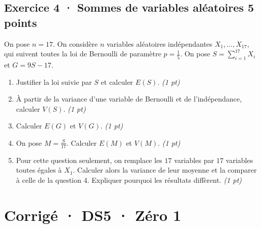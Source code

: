 \subsection*{Exercice 4 · Sommes de variables aléatoires \hfill 5 points}On pose $n=17$. On considère $n$ variables aléatoires indépendantes $X_1,\ldots,X_{17}$, qui suivent toutes la loi de Bernoulli de paramètre $p=\frac{1}{5}$. On pose $S=\displaystyle\sum_{i=1}^{17}X_i$ et $G=9S-17$.

\begin{enumerate}

\item Justifier la loi suivie par $S$ et calculer $E(S)$. \hfill\textit{(1 pt)}

\item À partir de la variance d'une variable de Bernoulli et de l'indépendance, calculer $V(S)$. \hfill\textit{(1 pt)}

\item Calculer $E(G)$ et $V(G)$. \hfill\textit{(1 pt)}

\item On pose $M=\frac S{17}$. Calculer $E(M)$ et $V(M)$. \hfill\textit{(1 pt)}

\item Pour cette question seulement, on remplace les $17$ variables par $17$ variables toutes égales à $X_1$. Calculer alors la variance de leur moyenne et la comparer à celle de la question 4. Expliquer pourquoi les résultats diffèrent. \hfill\textit{(1 pt)}

\end{enumerate}

\ifprof\clearpage

\section*{Corrigé · DS5 · Zéro 1}\label{cor:7-1}


